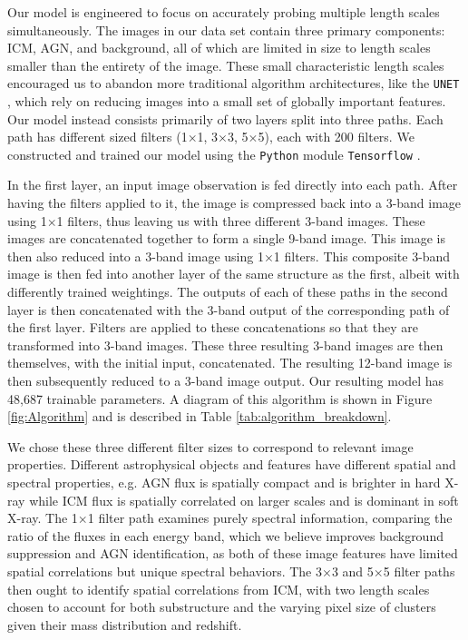Our model is engineered to focus on accurately probing multiple length scales simultaneously. The images in our data set contain three primary components: ICM, AGN, and background, all of which are limited in size to length scales smaller than the entirety of the image. These small characteristic length scales encouraged us to abandon more traditional algorithm architectures, like the \texttt{UNET} \cite{UNET}, which rely on reducing images into a small set of globally important features. Our model instead consists primarily of two layers split into three paths. Each path has different sized filters (1$\times$1, 3$\times$3, 5$\times$5), each with 200 filters. We constructed and trained our model using the \texttt{Python} \cite{Python3} module \texttt{Tensorflow} \cite{tensorflow2015-whitepaper}.

In the first layer, an input image observation is fed directly into each path. After having the filters applied to it, the image is compressed back into a 3-band image using 1$\times$1 filters, thus leaving us with three different 3-band images. These images are concatenated together to form a single 9-band image. This image is then also reduced into a 3-band image using 1$\times$1 filters. This composite 3-band image is then fed into another layer of the same structure as the first, albeit with differently trained weightings. The outputs of each of these paths in the second layer is then concatenated with the 3-band output of the corresponding path of the first layer. Filters are applied to these concatenations so that they are transformed into 3-band images. These three resulting 3-band images are then themselves, with the initial input, concatenated. The resulting 12-band image is then subsequently reduced to a 3-band image output. Our resulting model has 48,687 trainable parameters. A diagram of this algorithm is shown in Figure \ref{fig:Algorithm} and is described in Table \ref{tab:algorithm_breakdown}.

We chose these three different filter sizes to correspond to relevant image properties. Different astrophysical objects and features have different spatial and spectral properties, e.g. AGN flux is spatially compact and is brighter in hard X-ray while ICM flux is spatially correlated on larger scales and is dominant in soft X-ray. The 1$\times$1 filter path examines purely spectral information, comparing the ratio of the fluxes in each energy band, which we believe improves background suppression and AGN identification, as both of these image features have limited spatial correlations but unique spectral behaviors. The 3$\times$3 and 5$\times$5 filter paths then ought to identify spatial correlations from ICM, with two length scales chosen to account for both substructure and the varying pixel size of clusters given their mass distribution and redshift.

